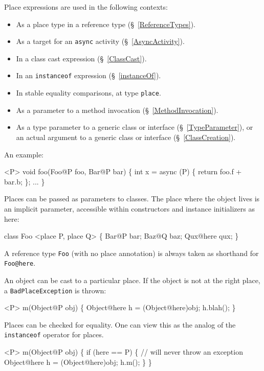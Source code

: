 Place expressions are used in the following contexts: 
\begin{itemize}
\item As a  place type in a reference type (\S~\ref{ReferenceTypes}).
\item As a target for an {\tt async} activity (\S~\ref{AsyncActivity}).
\item In a class cast expression  (\S~\ref{ClassCast}).
\item In an {\tt instanceof} expression (\S~\ref{instanceOf}).
\item In stable equality comparisons, at type {\tt place}.
\item As a parameter to a method invocation (\S~\ref{MethodInvocation}).
{}\item As a type parameter to a generic class or interface
(\S~\ref{TypeParameter}), or an actual argument to a generic class or interface (\S~\ref{ClassCreation}).
\end{itemize}

An example:
\begin{x10}
<P> void foo(Foo@P foo, Bar@P bar) \{
   int x = async (P) \{ return foo.f + bar.b; \};
   ...
\}
\end{x10}


Places can be passed as parameters to classes. The place where the
object lives is an implicit parameter, accessible within constructors
and instance initializers as here:

\begin{x10}
    class Foo <place P, place Q> \{
        Bar@P bar;
        Baz@Q baz;
        Qux@here qux;
    \}
\end{x10}

A reference type {\tt Foo} (with no place annotation) is always taken
as shorthand for {\tt Foo@here}.

An object can be cast to a particular place. If the object is not at
the right place, a {\tt BadPlaceException} is thrown:

\begin{x10}
    <P> m(Object@P obj) \{
        Object@here h = (Object@here)obj;
        h.blah();
    \}
\end{x10}

Places can be checked for equality. One can view this as the analog of
the {\tt instanceof} operator for places.

\begin{x10}
 <P> m(Object@P obj) \{
     if (here == P) \{
        // will never throw an exception
       Object@here h = (Object@here)obj;
       h.m();
   \}
\}
\end{x10}

